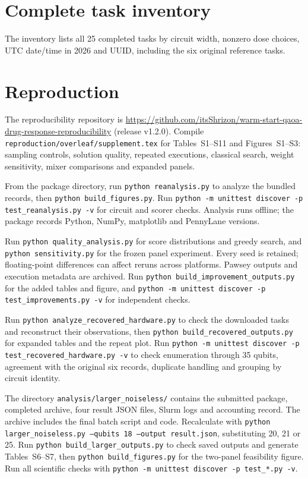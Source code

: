 \documentclass[utf8]{frontiers_suppmat}
\begin{document}
\clearpage

\clearpage
\section{Complete task inventory}
The inventory lists all 25 completed tasks by circuit width, nonzero dose choices, UTC date/time in 2026 and UUID, including the six original reference tasks.


\clearpage
\section{Reproduction}
The reproducibility repository is \url{https://github.com/itsShrizon/warm-start-qaoa-drug-response-reproducibility} (release v1.2.0). Compile \texttt{reproduction/overleaf/supplement.tex} for Tables~S1--S11 and Figures~S1--S3: sampling controls, solution quality, repeated executions, classical search, weight sensitivity, mixer comparisons and expanded panels.

From the package directory, run \texttt{python reanalysis.py} to analyze the bundled records, then \texttt{python build\_figures.py}. Run \texttt{python -m unittest discover -p test\_reanalysis.py -v} for circuit and scorer checks. Analysis runs offline; the package records Python, NumPy, matplotlib and PennyLane versions.

Run \texttt{python quality\_analysis.py} for score distributions and greedy search, and \texttt{python sensitivity.py} for the frozen panel experiment. Every seed is retained; floating-point differences can affect reruns across platforms. Pawsey outputs and execution metadata are archived. Run \texttt{python build\_improvement\_outputs.py} for the added tables and figure, and \texttt{python -m unittest discover -p test\_improvements.py -v} for independent checks.

Run \texttt{python analyze\_recovered\_hardware.py} to check the downloaded tasks and reconstruct their observations, then \texttt{python build\_recovered\_outputs.py} for expanded tables and the repeat plot. Run \texttt{python -m unittest discover -p test\_recovered\_hardware.py -v} to check enumeration through 35 qubits, agreement with the original six records, duplicate handling and grouping by circuit identity.

The directory \texttt{analysis/larger\_noiseless/} contains the submitted package, completed archive, four result JSON files, Slurm logs and accounting record. The archive includes the final batch script and code. Recalculate with \texttt{python larger\_noiseless.py --qubits 18 --output result.json}, substituting 20, 21 or 25. Run \texttt{python build\_larger\_outputs.py} to check saved outputs and generate Tables~S6--S7, then \texttt{python build\_figures.py} for the two-panel feasibility figure. Run all scientific checks with \texttt{python -m unittest discover -p test\_*.py -v}.
\end{document}

